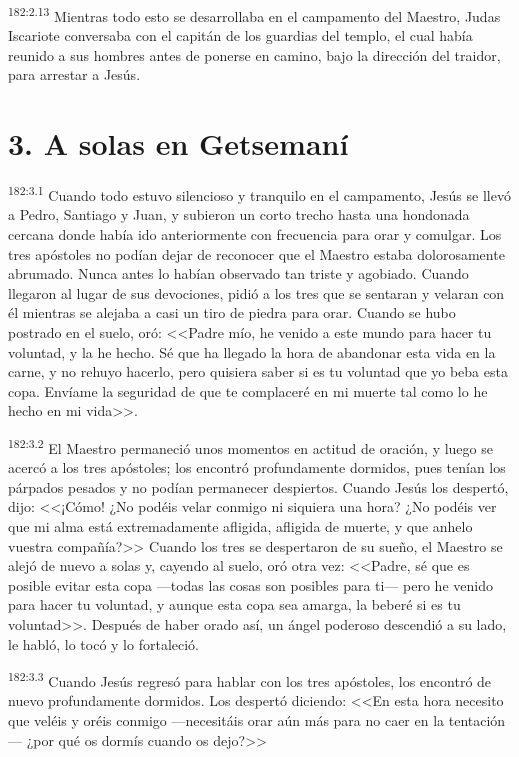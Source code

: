\par 
\textsuperscript{182:2.13} Mientras todo esto se desarrollaba en el campamento del Maestro, Judas Iscariote conversaba con el capitán de los guardias del templo, el cual había reunido a sus hombres antes de ponerse en camino, bajo la dirección del traidor, para arrestar a Jesús.

\section*{3. A solas en Getsemaní}
\par 
\textsuperscript{182:3.1} Cuando todo estuvo silencioso y tranquilo en el campamento, Jesús se llevó a Pedro, Santiago y Juan, y subieron un corto trecho hasta una hondonada cercana donde había ido anteriormente con frecuencia para orar y comulgar. Los tres apóstoles no podían dejar de reconocer que el Maestro estaba dolorosamente abrumado. Nunca antes lo habían observado tan triste y agobiado. Cuando llegaron al lugar de sus devociones, pidió a los tres que se sentaran y velaran con él mientras se alejaba a casi un tiro de piedra para orar. Cuando se hubo postrado en el suelo, oró: <<Padre mío, he venido a este mundo para hacer tu voluntad, y la he hecho. Sé que ha llegado la hora de abandonar esta vida en la carne, y no rehuyo hacerlo, pero quisiera saber si es tu voluntad que yo beba esta copa. Envíame la seguridad de que te complaceré en mi muerte tal como lo he hecho en mi vida>>.

\par 
\textsuperscript{182:3.2} El Maestro permaneció unos momentos en actitud de oración, y luego se acercó a los tres apóstoles; los encontró profundamente dormidos, pues tenían los párpados pesados y no podían permanecer despiertos. Cuando Jesús los despertó, dijo: <<¡Cómo! ¿No podéis velar conmigo ni siquiera una hora? ¿No podéis ver que mi alma está extremadamente afligida, afligida de muerte, y que anhelo vuestra compañía?>> Cuando los tres se despertaron de su sueño, el Maestro se alejó de nuevo a solas y, cayendo al suelo, oró otra vez: <<Padre, sé que es posible evitar esta copa ---todas las cosas son posibles para ti--- pero he venido para hacer tu voluntad, y aunque esta copa sea amarga, la beberé si es tu voluntad>>. Después de haber orado así, un ángel poderoso descendió a su lado, le habló, lo tocó y lo fortaleció.

\par 
\textsuperscript{182:3.3} Cuando Jesús regresó para hablar con los tres apóstoles, los encontró de nuevo profundamente dormidos. Los despertó diciendo: <<En esta hora necesito que veléis y oréis conmigo ---necesitáis orar aún más para no caer en la tentación--- ¿por qué os dormís cuando os dejo?>>

